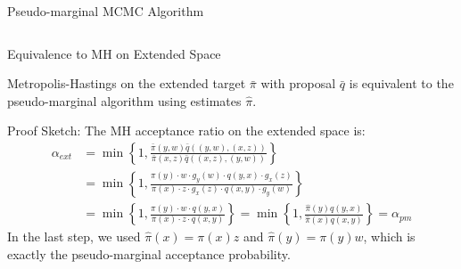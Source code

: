 \documentclass[aspectratio=169]{beamer}
\begin{document}
\begin{frame}{Pseudo-marginal MCMC Algorithm}
\begin{columns}


	\end{columns}
\end{frame}

\begin{frame}{Equivalence to MH on Extended Space}
	\begin{theorem}[Equivalence]
		Metropolis-Hastings on the extended target $\bar{\pi}$ with proposal $\bar{q}$ is equivalent to the pseudo-marginal algorithm using estimates $\hat{\pi}$.
	\end{theorem}

	Proof Sketch:
	The MH acceptance ratio on the extended space is:
	\begin{align*}
		\alpha_{ext} & = \min\left\{1, \frac{\bar{\pi}(y,w)\bar{q}((y,w),(x,z))}{\bar{\pi}(x,z)\bar{q}((x,z),(y,w))}\right\}                                       \\
		             & = \min\left\{1, \frac{\pi(y) \cdot w \cdot g_y(w) \cdot q(y,x) \cdot g_x(z)}{\pi(x) \cdot z \cdot g_x(z) \cdot q(x,y) \cdot g_y(w)}\right\} \\
		             & = \min\left\{1, \frac{\pi(y) \cdot w \cdot q(y,x)}{\pi(x) \cdot z \cdot q(x,y)}\right\}
		= \min\left\{1, \frac{\hat{\pi}(y)q(y,x)}{\hat{\pi}(x)q(x,y)}\right\} = \alpha_{pm}
	\end{align*}
	In the last step, we used $\hat{\pi}(x) = \pi(x) z$ and $\hat{\pi}(y) = \pi(y) w$,
	which is exactly the pseudo-marginal acceptance probability.

\end{frame}
\end{document}
